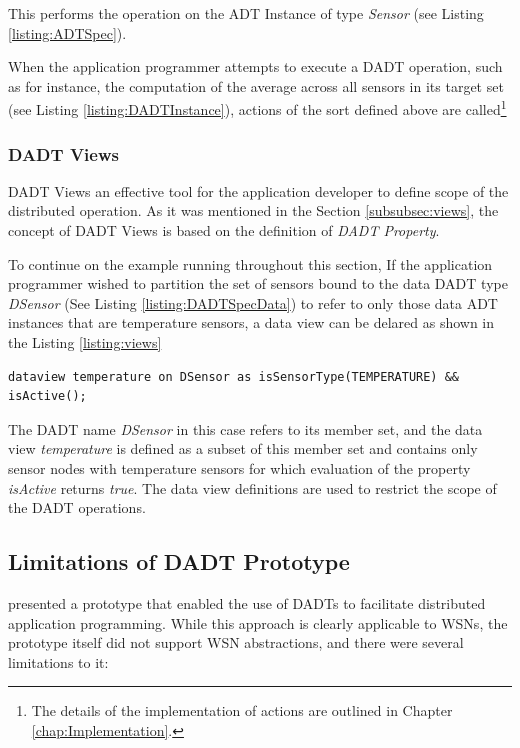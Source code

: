 This performs the operation on the ADT Instance of type \emph{Sensor} (see
Listing \ref{listing:ADTSpec}).

When the application programmer attempts to execute a DADT operation, such as
for instance, the computation of the average
across all sensors in its target set (see Listing \ref{listing:DADTInstance}),
actions of the sort defined above are called\footnote{The details of the
implementation of actions are outlined in Chapter \ref{chap:Implementation}.} 

\subsubsection{DADT Views} \label{subsubsec:viewsImpl}

DADT Views an effective tool for the application developer to define scope
of the distributed operation. As it was mentioned in the Section
\ref{subsubsec:views}, the concept of DADT Views is based on the definition of
\emph{DADT Property}.

To continue on the example running throughout this section, If the application
programmer wished to partition the set of sensors bound to the data DADT type
\emph{DSensor} (See Listing \ref{listing:DADTSpecData}) to refer to only those
data ADT instances that are temperature sensors, a data view can be delared
as shown in the Listing \ref{listing:views} 
  
\begin{lstlisting}[frame=trbl, basewidth={0.55em, 0.6em}, captionpos=b, 
basicstyle=\ttfamily\footnotesize, breaklines, caption = Definition of DADT Data View, label = listing:views ]  
dataview temperature on DSensor as isSensorType(TEMPERATURE) && isActive(); 
\end{lstlisting}

The DADT name \emph{DSensor} in this case refers to its member set, and 
the data view \emph{temperature} is defined as a subset of this member set and
contains only sensor nodes with temperature sensors for which evaluation of
the property \emph{isActive} returns \emph{true}. The data view definitions are
used to restrict  the scope of the DADT operations.


\subsection{Limitations of DADT Prototype}

\cite{migliavacca_DADT:2006} presented a prototype that enabled the use of DADTs
to facilitate distributed application programming. While this approach is
clearly applicable to WSNs, the prototype itself did not support WSN
abstractions, and there were several limitations to it:

